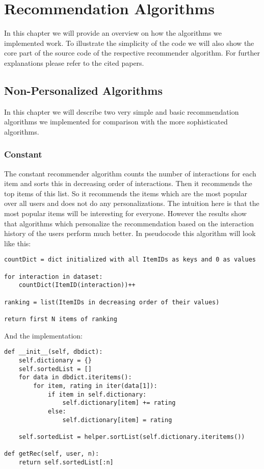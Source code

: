 
\chapter{Recommendation Algorithms}
\label{recommendationalgorithms}
In this chapter we will provide an overview on how the algorithms we implemented
work. To illustrate the simplicity of the code we will also show the core part of 
the source code of the respective recommender algorithm.
For further explanations please refer to the cited papers.


\section{Non-Personalized Algorithms}

In this chapter we will describe two very simple and basic recommendation
algorithms we implemented for comparison with the more sophisticated
algorithms.


\subsection{Constant}

The constant recommender algorithm counts the number of interactions
for each item and sorts this in decreasing order of interactions.
Then it recommends the top items of this list. So it recommends the
items which are the most popular over all users and does not do any
personalizations. The intuition here is that the most popular items
will be interesting for everyone. However the results show that
algorithms which personalize the recommendation based on the 
interaction history of the users perform much better.
In pseudocode this algorithm will look like this:
\begin{lstlisting}[style=pseudocode]
countDict = dict initialized with all ItemIDs as keys and 0 as values

for interaction in dataset:
    countDict(ItemID(interaction))++

ranking = list(ItemIDs in decreasing order of their values)

return first N items of ranking
\end{lstlisting}
And the implementation:
\begin{lstlisting}[style=python]
def __init__(self, dbdict):
    self.dictionary = {}
    self.sortedList = []
    for data in dbdict.iteritems():
        for item, rating in iter(data[1]):
            if item in self.dictionary:
                self.dictionary[item] += rating
            else:
                self.dictionary[item] = rating

    self.sortedList = helper.sortList(self.dictionary.iteritems())

def getRec(self, user, n):
    return self.sortedList[:n]
\end{lstlisting}



